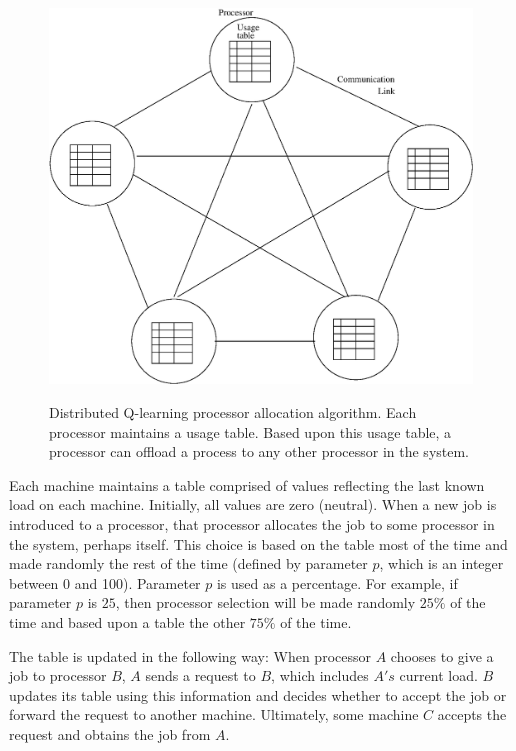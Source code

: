\documentclass{report}
\begin{document}
\begin{figure}
	\resizebox{\textwidth}{!}
	{
	{\includegraphics{figs/random-dpa.eps}}}
	\caption[Distributed Q-learning Algorithm]{Distributed Q-learning
	processor allocation algorithm.  Each processor maintains a usage
	table.  Based upon this usage table, a processor can offload a
	process to any other processor in the system.}
	\label{fig:random}
\end{figure}


Each machine maintains a table comprised of values reflecting the last known
load on each machine.  Initially, all values are zero (neutral).  When a new
job is introduced to a processor, that processor allocates the job to some
processor in the system, perhaps itself.  This choice is based on the table
most of the time and made randomly the rest of the time (defined by
parameter $p$, which is an integer between 0 and 100).  Parameter $p$ is
used as a percentage.  For example, if parameter $p$ is $25$, then
processor selection will be made randomly $25\%$ of the time and based upon
a table the other $75\%$ of the time.

The table is updated in the following way: When processor $A$ chooses to
give a job to processor $B$, $A$ sends a request to $B$, which includes
$A's$ current load.  $B$ updates its table using this information and
decides whether to accept the job or forward the request to another machine.
Ultimately, some machine $C$ accepts the request and obtains the job from
$A$.  
\end{document}
